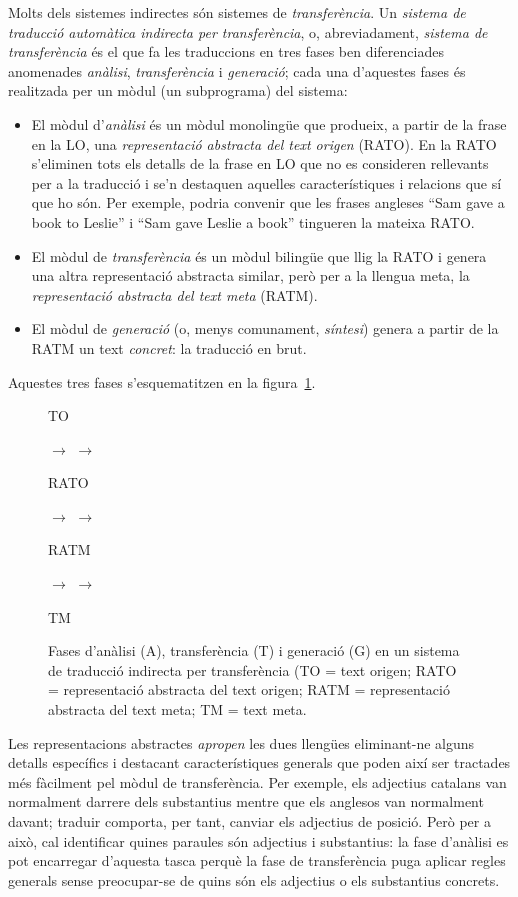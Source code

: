 \label{ss:classtrans}
Molts dels sistemes indirectes són sistemes de
\emph{transferència}. Un \emph{sistema de traducció automàtica
  indirecta per transferència}, o, abreviadament, \emph{sistema de
  transferència} és el que fa les traduccions en tres fases ben
diferenciades anomenades \emph{anàlisi}, \emph{transferència} i
\emph{generació}; cada una d'aquestes fases és realitzada per un mòdul
(un subprograma) del sistema:
\begin{itemize}
\item El mòdul d'\emph{anàlisi} és un mòdul monolingüe que produeix, a
  partir de la frase en la LO, una \emph{representació abstracta del text
  origen} (RATO). En la RATO s'eliminen tots els detalls de la frase
  en LO que no es consideren rellevants per a la traducció i se'n destaquen
  aquelles característiques i relacions que sí que ho són.  Per
  exemple, podria convenir que les frases angleses ``Sam gave a book
  to Leslie'' i ``Sam gave Leslie a book'' \citep{arnold93j} tingueren
  la mateixa RATO.
\item El mòdul de \emph{transferència} és un mòdul bilingüe que llig
  la RATO i genera una altra representació abstracta similar, però per
  a la llengua meta, la \emph{representació abstracta del text meta}
  (RATM).
\item El mòdul de \emph{generació} (o, menys comunament,
  \emph{síntesi}) genera a partir de la RATM un text \emph{concret}: la
  traducció en brut.
\end{itemize}
Aquestes tres fases s'esquematitzen en la
figura~\ref{fg:transfer}. 


\begin{figure}
\begin{center}
\parbox{0.5cm}{TO} $\to$
 $\to$ 
\parbox{1.0cm}{RATO} $\to$
 $\to$
\parbox{1.25cm}{RATM} $\to$
 $\to$
\parbox{0.5cm}{TM} 
\end{center}
\caption{Fases d'anàlisi (A), transferència (T) i generació (G) en un
sistema de traducció indirecta per transferència (TO = text origen; RATO = representació abstracta del text origen; RATM = representació abstracta del text meta; TM = text meta.}
\label{fg:transfer} 
\end{figure}

Les representacions abstractes \emph{apropen} les dues llengües
eliminant-ne alguns detalls específics i destacant característiques
generals que poden així ser tractades més fàcilment pel mòdul de
transferència. Per exemple, els adjectius catalans van normalment
darrere dels substantius mentre que els anglesos van normalment
davant; traduir comporta, per tant, canviar els adjectius de
posició. Però per a això, cal identificar quines paraules són
adjectius i substantius: la fase d'anàlisi es pot encarregar d'aquesta
tasca perquè la fase de transferència puga aplicar regles generals
sense preocupar-se de quins són els adjectius o els substantius
concrets.


